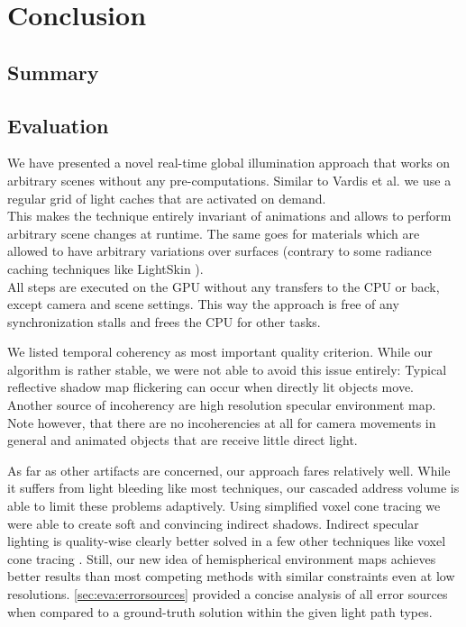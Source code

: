\documentclass[thesis.tex]{subfiles}
\begin{document}
\chapter{Conclusion}\label{chap:concl}

\section{Summary}


\section{Evaluation}
We have presented a novel real-time global illumination approach that works on arbitrary scenes without any pre-computations.
Similar to Vardis et al. \cite{bib:radiancecachechromaticcompression} we use a regular grid of light caches that are activated on demand.
\\
This makes the technique entirely invariant of animations and allows to perform arbitrary scene changes at runtime.
The same goes for materials which are allowed to have arbitrary variations over surfaces (contrary to some radiance caching techniques like LightSkin \cite{bib:LightskinPaper}).
\\
All steps are executed on the GPU without any transfers to the CPU or back, except camera and scene settings.
This way the approach is free of any synchronization stalls and frees the CPU for other tasks.

We listed temporal coherency as most important quality criterion.
While our algorithm is rather stable, we were not able to avoid this issue entirely:
Typical reflective shadow map flickering can occur when directly lit objects move.
Another source of incoherency are high resolution specular environment map.
Note however, that there are no incoherencies at all for camera movements in general and animated objects that are receive little direct light.

As far as other artifacts are concerned, our approach fares relatively well.
While it suffers from light bleeding like most techniques, our cascaded address volume is able to limit these problems adaptively.
Using simplified voxel cone tracing we were able to create soft and convincing indirect shadows.
Indirect specular lighting is quality-wise clearly better solved in a few other techniques like voxel cone tracing \cite{bib:voxelconetracing}.
Still, our new idea of hemispherical environment maps achieves better results than most competing methods with similar constraints even at low resolutions.
\autoref{sec:eva:errorsources} provided a concise analysis of all error sources when compared to a ground-truth solution within the given light path types.
\end{document}
